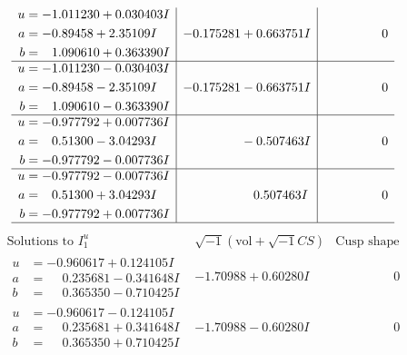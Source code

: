 \documentclass[1p]{elsarticle_modified}
\theoremstyle{definition}
\newcommand{\I}{\sqrt{-1}}
\begin{document}
$$\begin{array}{c|c|c}
\begin{aligned}
u &= -1.011230 + 0.030403 I \\
a &= -0.89458 + 2.35109 I \\
b &= \phantom{-}1.090610 + 0.363390 I\end{aligned}
 & -0.175281 + 0.663751 I & \phantom{-0.000000 } 0 \\ \hline\begin{aligned}
u &= -1.011230 - 0.030403 I \\
a &= -0.89458 - 2.35109 I \\
b &= \phantom{-}1.090610 - 0.363390 I\end{aligned}
 & -0.175281 - 0.663751 I & \phantom{-0.000000 } 0 \\ \hline\begin{aligned}
u &= -0.977792 + 0.007736 I \\
a &= \phantom{-}0.51300 - 3.04293 I \\
b &= -0.977792 - 0.007736 I\end{aligned}
 & \phantom{-0.000000 } -0.507463 I & \phantom{-0.000000 } 0 \\ \hline\begin{aligned}
u &= -0.977792 - 0.007736 I \\
a &= \phantom{-}0.51300 + 3.04293 I \\
b &= -0.977792 + 0.007736 I\end{aligned}
 & \phantom{-0.000000 -}0.507463 I & \phantom{-0.000000 } 0\\
 \hline 
 \end{array}$$\newpage$$\begin{array}{c|c|c}  
\text{Solutions to }I^u_{1}& \I (\text{vol} + \sqrt{-1}CS) & \text{Cusp shape}\\
 \hline 
\begin{aligned}
u &= -0.960617 + 0.124105 I \\
a &= \phantom{-}0.235681 - 0.341648 I \\
b &= \phantom{-}0.365350 - 0.710425 I\end{aligned}
 & -1.70988 + 0.60280 I & \phantom{-0.000000 } 0 \\ \hline\begin{aligned}
u &= -0.960617 - 0.124105 I \\
a &= \phantom{-}0.235681 + 0.341648 I \\
b &= \phantom{-}0.365350 + 0.710425 I\end{aligned}
 & -1.70988 - 0.60280 I & \phantom{-0.000000 } 0 \\ \hline\begin{aligned}

\end{aligned}
\end{array}$$
\end{document}
